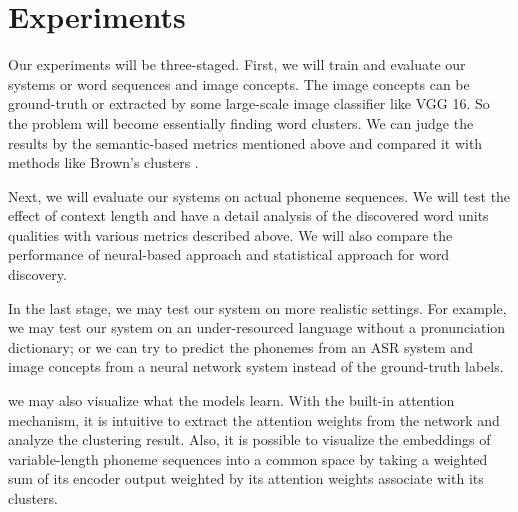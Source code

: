 \documentclass[a4paper]{article}
\begin{document}
\section{Experiments}
Our experiments will be three-staged. First, we will train and evaluate our systems or word sequences and image concepts. The image concepts can be ground-truth or extracted by some large-scale image classifier like VGG 16. So the problem will become essentially finding word clusters. We can judge the results by the semantic-based metrics mentioned above and compared it with methods like Brown's clusters \cite{Brown92}.  

Next, we will evaluate our systems on actual phoneme sequences. We will test the effect of context length and have a detail analysis of the discovered word units qualities with various metrics described above. We will also compare the performance of neural-based approach and statistical approach for word discovery.

In the last stage, we may test our system on more realistic settings. For example, we may test our system on an under-resourced language without a pronunciation dictionary; or we can try to predict the phonemes from an ASR system and image concepts from a neural network system instead of the ground-truth labels.  

we may also visualize what the models learn. With the built-in attention mechanism, it is intuitive to extract the attention weights from the network and analyze the clustering result. Also, it is possible to visualize the embeddings of variable-length phoneme sequences into a common space by taking a weighted sum of its encoder output weighted by its attention weights associate with its clusters.

\begin{comment}
In either stage, our experiments should address the following questions:
\begin{enumerate}
    \item How well does the model learn?
    \item Which model learns the best?
    \item What does the network learn, does it cluster word sequences with similar meaning together in its embedding space?

    \item When and why the method fails?
\end{enumerate}
\end{comment}
\end{document}
